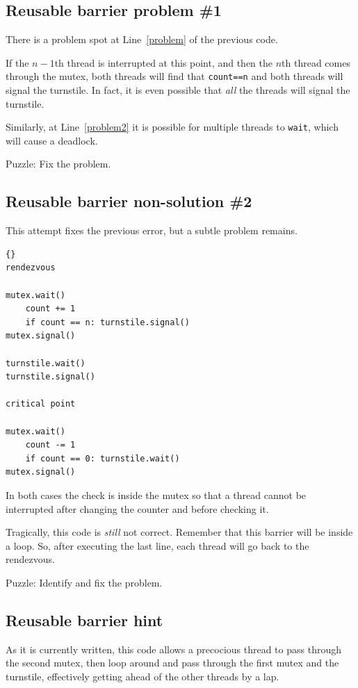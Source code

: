 \documentclass{book}
\begin{document}
\subsection {Reusable barrier problem \#1}

There is a problem spot at Line~\ref{problem} of the previous code.

If the $n-1$th thread is interrupted at this point,
and then the $n$th thread comes through the mutex,
both threads will find that {\tt count==n} and both
threads will signal the turnstile.  In fact, it is even
possible that {\em all} the threads will signal the turnstile.

Similarly, at Line~\ref{problem2} it is possible for multiple
threads to {\tt wait}, which will cause a deadlock.

Puzzle: Fix the problem.


\subsection {Reusable barrier non-solution \#2}

This attempt fixes the previous error, but a subtle problem
remains.

\newpage
\begin{lstlisting}[title={Reusable barrier non-solution}]{}
rendezvous

mutex.wait()
    count += 1
    if count == n: turnstile.signal()
mutex.signal()

turnstile.wait()
turnstile.signal()

critical point

mutex.wait()
    count -= 1
    if count == 0: turnstile.wait()
mutex.signal()
\end{lstlisting}

In both cases the check is inside the mutex so that
a thread cannot be interrupted after changing the counter
and before checking it.

Tragically, this code is {\em still} not correct.
Remember that this barrier will be inside a loop.  So, after
executing the last line, each thread will go back
to the rendezvous.

Puzzle: Identify and fix the problem.



\subsection {Reusable barrier hint}

As it is currently written, this code
allows a precocious thread to pass through the second mutex,
then loop around and pass through the first mutex and the
turnstile, effectively getting ahead of the other threads by
a lap.
\end{document}
